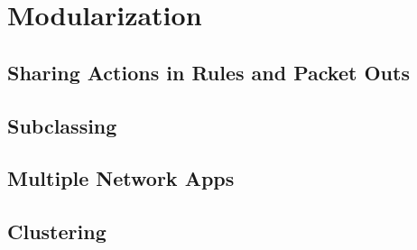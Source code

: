 \chapter{Modularization}
\label{chapter:modularization}

\section{Sharing Actions in Rules and Packet Outs}
 \label{modularization:sharing_predicates}

\section{Subclassing}

\section{Multiple Network Apps}

\section{Clustering}


